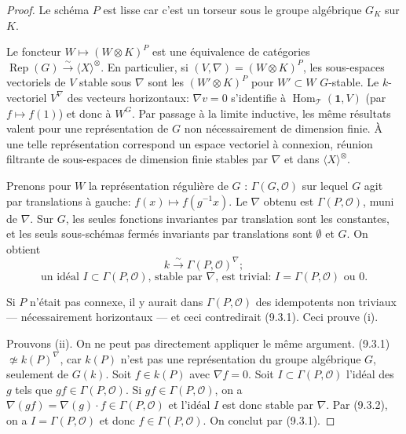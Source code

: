 \documentclass[12pt,a4paper]{article}
\theoremstyle{plain}
\theoremstyle{definition}
\DeclareMathOperator{\Hom}{Hom}
\DeclareMathOperator{\Rep}{Rep}
\begin{document}
\begin{proof}
Le schéma $P$ est lisse car c'est un torseur sous le groupe algébrique $G_K$ sur $K$.

Le foncteur $W \mapsto (W \otimes K)^P$ est une équivalence de catégories $\Rep(G) \xrightarrow{\sim} \langle X \rangle^\otimes$. En particulier, si $(V, \nabla) = (W \otimes K)^P$, les sous-espaces vectoriels de $V$ stable sous $\nabla$ sont les $(W' \otimes K)^P$ pour $W' \subset W$ $G$-stable. Le $k$-vectoriel $V^\nabla$ des vecteurs horizontaux: $\nabla v = 0$ s'identifie à $\Hom_\mathcal{T}(\mathbf{1}, V)$ (par $f \mapsto f(1)$) et donc à $W^G$. Par passage à la limite inductive, les même résultats valent pour une représentation de $G$ non nécessairement de dimension finie. À une telle représentation correspond un espace vectoriel à connexion, réunion filtrante de sous-espaces de dimension finie stables par $\nabla$ et dans $\langle X \rangle^\otimes$.

Prenons pour $W$ la représentation régulière de $G$ : $\Gamma(G, \mathcal{O})$ sur lequel $G$ agit par translations à gauche: $f(x) \mapsto f(g^{-1}x)$. Le $\nabla$ obtenu est $\Gamma(P, \mathcal{O})$, muni de $\nabla$. Sur $G$, les seules fonctions invariantes par translation sont les constantes, et les seuls sous-schémas fermés invariants par translations sont $\emptyset$ et $G$. On obtient
\begin{equation}\label{eq:9.3.1}
k \xrightarrow{\sim} \Gamma(P, \mathcal{O})^\nabla;
\end{equation}
\begin{equation}\label{eq:9.3.2}
\text{un idéal } I \subset \Gamma(P, \mathcal{O}) \text{, stable par } \nabla \text{, est trivial: } I = \Gamma(P, \mathcal{O}) \text{ ou } 0.
\end{equation}

Si $P$ n'était pas connexe, il y aurait dans $\Gamma(P, \mathcal{O})$ des idempotents non triviaux --- nécessairement horizontaux --- et ceci contredirait (9.3.1). Ceci prouve (i).

Prouvons (ii). On ne peut pas directement appliquer le même argument. (9.3.1) $\not\simeq k(P)^\nabla$, car $k(P)$ n'est pas une représentation du groupe algébrique $G$, seulement de $G(k)$. Soit $f \in k(P)$ avec $\nabla f = 0$. Soit $I \subset \Gamma(P, \mathcal{O})$ l'idéal des $g$ tels que $gf \in \Gamma(P, \mathcal{O})$. Si $gf \in \Gamma(P, \mathcal{O})$, on a $\nabla(gf) = \nabla(g) \cdot f \in \Gamma(P, \mathcal{O})$ et l'idéal $I$ est donc stable par $\nabla$. Par (9.3.2), on a $I = \Gamma(P, \mathcal{O})$ et donc $f \in \Gamma(P, \mathcal{O})$. On conclut par (9.3.1).
\end{proof}
\end{document}
